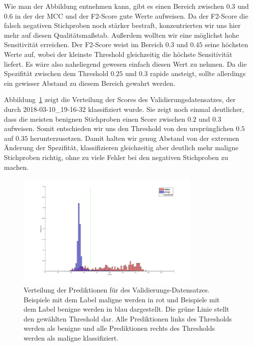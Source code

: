Wie man der Abbildung entnehmen kann, gibt es einen Bereich zwischen $0.3$ und $0.6$ in der der MCC und der F2-Score gute Werte aufweisen. Da der F2-Score die falsch negativen Stichproben noch stärker bestraft, konzentrierten wir uns hier mehr auf diesen Qualitätsmaßstab. Außerdem wollten wir eine möglichst hohe Sensitivität erreichen. Der F2-Score weist im Bereich $0.3$ und $0.45$ seine höchsten Werte auf, wobei der kleinste Threshold gleichzeitig die höchste Sensitivität liefert. Es wäre also naheliegend gewesen einfach diesen Wert zu nehmen. Da die Spezifität zwischen dem Threshold $0.25$ und $0.3$ rapide ansteigt, sollte allerdings ein gewisser Abstand zu diesem Bereich gewahrt werden. 

Abbildung~\ref{fig:verteilung} zeigt die Verteilung der Scores des Validierungsdatensatzes, der durch 2018-03-10\_19-16-32 klassifiziert wurde. Sie zeigt noch einmal deutlicher, dass die meisten benignen Stichproben einen Score zwischen $0.2$ und $0.3$ aufweisen. Somit entschieden wir uns den Threshold von den ursprünglichen $0.5$ auf $0.35$ herunterzusetzen. Damit halten wir genug Abstand von der extremen Änderung der Spezifität, klassifizieren gleichzeitig aber deutlich mehr maligne Stichproben richtig, ohne zu viele Fehler bei den negativen Stichproben zu machen. 

\begin{figure}[htb!]
	\begin{center}
		\includegraphics[width=0.8\textwidth]{pics/threshold/score_threshold.png}
		\caption{Verteilung der Prediktionen für des Validierungs-Datensatzes. Beispiele mit dem Label maligne werden in rot und Beispiele mit dem Label benigne werden in blau dargestellt. Die grüne Linie stellt den gewählten Threshold dar. Alle Prediktionen links des Thresholds werden als benigne und alle Prediktionen rechts des Thresholds werden als maligne klassifiziert.}
		\label{fig:verteilung}
    \end{center}
\end{figure}


